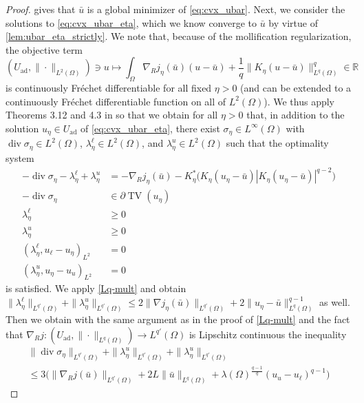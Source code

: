 \documentclass[11pt]{article}
\newcommand{\R}{\mathbb{R}}
\DeclareMathOperator*{\TV}{TV}
\DeclareMathOperator*{\dvg}{div}
\newcommand{\feas}{U_{\textrm{ad}}}
\theoremstyle{definition}
\theoremstyle{remark}
\begin{document}
\begin{proof}
 gives that $\bar{u}$
is a global minimizer of \eqref{eq:cvx_ubar}.
Next, we consider the solutions to \eqref{eq:cvx_ubar_eta},
which we know converge to $\bar{u}$ by virtue of \cref{lem:ubar_eta_strictly}.
We note that, because of the mollification regularization, the objective term
%
\[ (\feas,\|\cdot\|_{L^2(\Omega)}) \ni u \mapsto \int_{\Omega} \nabla_R j_\eta(\bar{u}) (u - \bar{u}) + \frac{1}{q}\|K_\eta (u - \bar{u})\|_{L^{q}(\Omega)}^{q} \in \R\]
%
is continuously Fr\'{e}chet differentiable for all fixed $\eta > 0$
(and can be extended to a continuously Fr\'{e}chet differentiable function on all of $L^2(\Omega)$). We thus apply Theorems 3.12 and 4.3 in \cite{natemeyer2022penalty}
so that we obtain for all $\eta > 0$ that, in addition to the solution
$u_\eta \in \feas$ of \eqref{eq:cvx_ubar_eta}, there exist
$\sigma_\eta \in L^\infty(\Omega)$ with $\dvg \sigma_\eta \in L^2(\Omega)$, $\lambda^\ell_\eta \in L^2(\Omega)$,
and $\lambda^u_\eta \in L^2(\Omega)$ such that the optimality system
%
\begin{align*}
-\dvg \sigma_\eta - \lambda^\ell_\eta + \lambda^u_\eta &= -\nabla_R j_\eta(\bar{u}) 
- K_\eta^* \big(K_\eta(u_\eta - \bar{u})|K_\eta(u_\eta - \bar{u})|^{q-2}\big) \\
-\dvg \sigma_\eta &\in \partial \TV (u_\eta) \\
\lambda^\ell_\eta &\ge 0 \\
\lambda^u_\eta &\ge 0 \\
(\lambda^\ell_\eta, u_\ell - u_\eta)_{L^2} &= 0\\
(\lambda^u_\eta, u_\eta - u_u)_{L^2} &= 0
\end{align*}
%
is satisfied. We apply \cref{Lq-mult} and obtain
%
$\|\lambda^\ell_\eta\|_{L^{q'}(\Omega)} + \|\lambda^u_\eta\|_{L^{q'}(\Omega)}
\le 2\|\nabla j_\eta(\bar{u})\|_{L^{q'}(\Omega)} 
   + 2 \|u_\eta - \bar{u}\|_{L^{q}(\Omega)}^{q-1}$ 
as well. Then we obtain with the same argument as in the proof of
\cref{Lq-mult} and the fact that $\nabla_R j : (\feas, \|\cdot\|_{L^{q}(\Omega)}) \to L^{q'}(\Omega)$ is Lipschitz continuous the inequality
%
\begin{multline*}
 \|\dvg \sigma_\eta\|_{L^{q'}(\Omega)} + \|\lambda^u_\eta\|_{L^{q'}(\Omega)} + \|\lambda^u_\eta\|_{L^{q'}(\Omega)}\\
\le 3 \big(\|\nabla_R j(\bar{u})\|_{L^{q'}(\Omega)} + 2L\|\bar{u}\|_{L^{q}(\Omega)}  + \lambda(\Omega)^{\frac{q-1}{q}}(u_u - u_\ell)^{q - 1}\big)
\end{multline*}

\end{proof}
\end{document}
